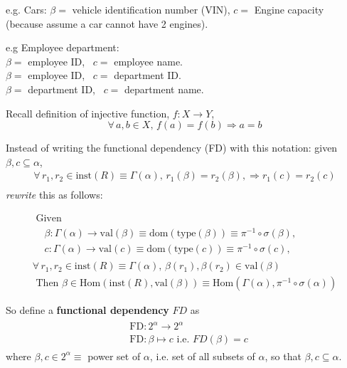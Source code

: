 e.g. Cars: $\beta = $ vehicle identification number (VIN), $c=$ Engine capacity (because assume a car cannot have 2 engines).

e.g Employee department: \\
$\beta = $ employee ID, \qquad \, $c = $ employee name. \\
$\beta = $ employee ID, \qquad \, $c = $ department ID. \\
$\beta = $ department ID, \qquad \, $c = $ department name.

Recall definition of injective function, $f:X \to Y$,
\[
\forall \, a,b \in X, \, f(a) = f(b) \Longrightarrow a =b
\]

Instead of writing the functional dependency (FD) with this notation: given $\beta, c \subseteq \alpha$, 
\[
\begin{gathered} 
\forall \, r_1, r_2 \in \text{inst}(R) \equiv \Gamma(\alpha), \, r_1(\beta) = r_2(\beta), \Longrightarrow r_1(c) = r_2(c) \\
\end{gathered} 
\]
\emph{rewrite} this as follows:

\begin{equation}
\begin{gathered} 
	\text{ Given } \\
	\begin{aligned} 
	& \beta : \Gamma(\alpha) \to \text{val}(\beta) \equiv \text{dom}(\text{type}(\beta)) \equiv \pi^{-1} \circ \sigma(\beta), \, \\
	& c : \Gamma(\alpha) \to \text{val}(c) \equiv \text{dom}(\text{type}(c)) \equiv \pi^{-1} \circ \sigma(c), \end{aligned} \\
\forall \, r_1, r_2 \in \text{inst}(R) \equiv \Gamma(\alpha), \, \beta(r_1), \beta(r_2) \in \text{val}(\beta)  \\
\text{ Then } \beta \in \text{Hom}(\text{inst}(R), \text{val}(\beta)) \equiv \text{Hom}(\Gamma(\alpha), \pi^{-1}\circ \sigma(\alpha))
\end{gathered} 
\end{equation}

So define a \textbf{functional dependency} $FD$ as 
\begin{equation}
\begin{gathered}
	\begin{aligned} 
&	\text{FD} : 2^{\alpha} \to 2^{\alpha} \\
& \text{FD} : \beta \mapsto c \text{ i.e. } \boxed{ FD(\beta) = c }
\end{aligned} 
\end{gathered}
\end{equation}
where $\beta, c \in 2^{\alpha} \equiv $ power set of $\alpha$, i.e. set of all subsets of $\alpha$, so that $\beta, c \subseteq \alpha$.  

